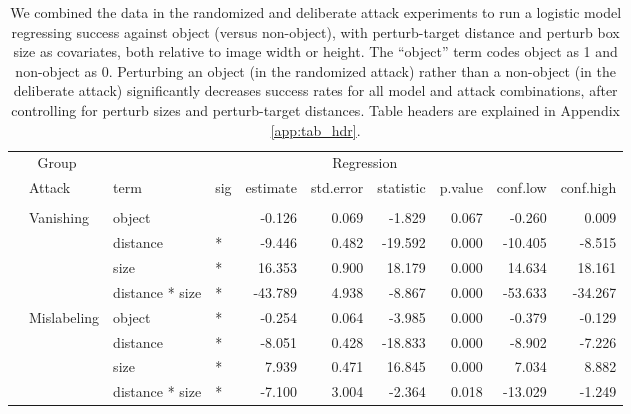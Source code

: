 \begin{longtable}[t]{llllrrrrrr}
\caption{\label{tab:rand_arb_compare_table}We combined the data in the randomized and deliberate attack experiments to run a logistic model regressing success against object (versus non-object), with perturb-target distance and perturb box size as covariates, both relative to image width or height. The ``object'' term codes object as 1 and non-object as 0. Perturbing an object (in the randomized attack) rather than a non-object (in the deliberate attack) significantly decreases success rates for all model and attack combinations, after controlling for perturb sizes and perturb-target distances. Table headers are explained in Appendix \ref{app:tab_hdr}.}\\
\toprule
\multicolumn{2}{c}{Group} & \multicolumn{8}{c}{Regression} \\
\cmidrule(l{3pt}r{3pt}){1-2} \cmidrule(l{3pt}r{3pt}){3-10}
 & Attack & term & sig & estimate & std.error & statistic & p.value & conf.low & conf.high\\
\midrule
\addlinespace[0.3em]
\multicolumn{10}{l}{\textbf{YOLOv3}}\\
\hspace{1em} & Vanishing & object &  & -0.126 & 0.069 & -1.829 & 0.067 & -0.260 & 0.009\\
\cmidrule{3-10}\nopagebreak
\hspace{1em} &  & distance & * & -9.446 & 0.482 & -19.592 & 0.000 & -10.405 & -8.515\\
\cmidrule{3-10}\nopagebreak
\hspace{1em} &  & size & * & 16.353 & 0.900 & 18.179 & 0.000 & 14.634 & 18.161\\
\cmidrule{3-10}\nopagebreak
\hspace{1em} &  & distance * size & * & -43.789 & 4.938 & -8.867 & 0.000 & -53.633 & -34.267\\
\cmidrule{2-10}\nopagebreak
\hspace{1em} & Mislabeling & object & * & -0.254 & 0.064 & -3.985 & 0.000 & -0.379 & -0.129\\
\cmidrule{3-10}\nopagebreak
\hspace{1em} &  & distance & * & -8.051 & 0.428 & -18.833 & 0.000 & -8.902 & -7.226\\
\cmidrule{3-10}\nopagebreak
\hspace{1em} &  & size & * & 7.939 & 0.471 & 16.845 & 0.000 & 7.034 & 8.882\\
\cmidrule{3-10}\nopagebreak
\hspace{1em} &  & distance * size & * & -7.100 & 3.004 & -2.364 & 0.018 & -13.029 & -1.249\\

\end{longtable}
